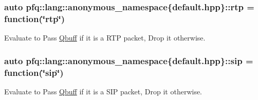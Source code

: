 \subsubsection[{\texorpdfstring{rtp}{rtp}}]{\setlength{\rightskip}{0pt plus 5cm}auto pfq\+::lang\+::anonymous\+\_\+namespace\{default.\+hpp\}\+::rtp = {\bf function}(\char`\"{}rtp\char`\"{})}\hypertarget{namespacepfq_1_1lang_1_1anonymous__namespace_02default_8hpp_03_aa8ac230fe8eeb0bccee8e31ba032cb8e}{}\label{namespacepfq_1_1lang_1_1anonymous__namespace_02default_8hpp_03_aa8ac230fe8eeb0bccee8e31ba032cb8e}


Evaluate to {\ttfamily Pass} \hyperlink{structpfq_1_1lang_1_1Qbuff}{Qbuff} if it is a R\+TP packet, {\ttfamily Drop} it otherwise. 

\subsubsection[{\texorpdfstring{sip}{sip}}]{\setlength{\rightskip}{0pt plus 5cm}auto pfq\+::lang\+::anonymous\+\_\+namespace\{default.\+hpp\}\+::sip = {\bf function}(\char`\"{}sip\char`\"{})}\hypertarget{namespacepfq_1_1lang_1_1anonymous__namespace_02default_8hpp_03_a3ac0338626e771b43b200663e095aa36}{}\label{namespacepfq_1_1lang_1_1anonymous__namespace_02default_8hpp_03_a3ac0338626e771b43b200663e095aa36}


Evaluate to {\ttfamily Pass} \hyperlink{structpfq_1_1lang_1_1Qbuff}{Qbuff} if it is a S\+IP packet, {\ttfamily Drop} it otherwise. 

